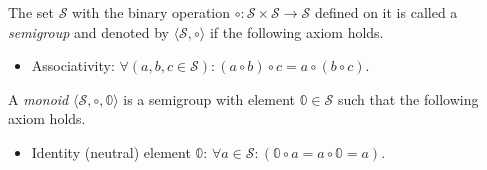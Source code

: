\begin{definition}[A semigroup]
The set $\mathcal{S}$ with the binary operation $\circ: \mathcal{S} \times \mathcal{S} \to \mathcal{S}$ defined on it is called a \emph{semigroup} and denoted by $\langle \mathcal{S}, \circ \rangle$ if the following axiom holds.
\begin{itemize}
    \item Associativity: $\forall (a, b, c\in \mathcal{S})\colon (a\circ b)\circ c = a\circ (b \circ c)$.
\end{itemize}
\end{definition}

\begin{definition}[A monoid]
	A \emph{monoid} $\langle \mathcal{S}, \circ, \mathbb{0} \rangle$ is a semigroup with element $\mathbb{0} \in \mathcal{S}$ such that the following axiom holds.
	\begin{itemize}
    \item Identity (neutral) element $\mathbb{0}$: $\forall a\in \mathcal{S}\colon (\mathbb{0} \circ a = a \circ \mathbb{0} = a)$.
    \end{itemize}
\end{definition}

